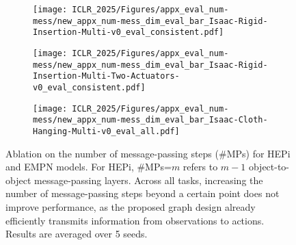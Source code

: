 \begin{figure*}[htb]
    \makebox[\textwidth][c]{
    
    }
    \centering
    \begin{subfigure}[b]{0.32\linewidth}
        \texttt{[image: ICLR\_2025/Figures/appx\_eval\_num-mess/new\_appx\_num-mess\_dim\_eval\_bar\_Isaac-Rigid-Insertion-Multi-v0\_eval\_consistent.pdf]}
    \end{subfigure}
    \hfill
    \begin{subfigure}[b]{0.32\linewidth}
        \texttt{[image: ICLR\_2025/Figures/appx\_eval\_num-mess/new\_appx\_num-mess\_dim\_eval\_bar\_Isaac-Rigid-Insertion-Multi-Two-Actuators-v0\_eval\_consistent.pdf]}
    \end{subfigure}
    \hfill
    \begin{subfigure}[b]{0.32\linewidth}
        \texttt{[image: ICLR\_2025/Figures/appx\_eval\_num-mess/new\_appx\_num-mess\_dim\_eval\_bar\_Isaac-Cloth-Hanging-Multi-v0\_eval\_all.pdf]}
    \end{subfigure}
    \caption{Ablation on the number of message-passing steps (\#MPs) for HEPi and EMPN models. For HEPi, \#MPs=$m$ refers to $m-1$ object-to-object message-passing layers. Across all tasks, increasing the number of message-passing steps beyond a certain point does not improve performance, as the proposed graph design already efficiently transmits information from observations to actions. Results are averaged over 5 seeds.}
    \vspace{-0.2cm}
    \label{fig:appx_mp_ablation}
\end{figure*}
